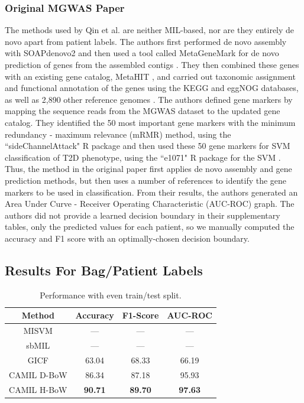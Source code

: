 \subsubsection{Original MGWAS Paper}

The methods used by Qin et al. \cite{qin041012} are neither MIL-based, nor are they entirely de novo apart from patient labels. The authors first performed de novo assembly with SOAPdenovo2 \cite{luo12} and then used a tool called MetaGeneMark \cite{zhu10, besemer99} for de novo prediction of genes from the assembled contigs \cite{qin041012}. They then combined these genes with an existing gene catalog, MetaHIT \cite{qin030410}, and carried out taxonomic assignment and functional annotation of the genes using the KEGG \cite{kanehisa00} and eggNOG \cite{powell12} databases, as well as 2,890 other reference genomes \cite{qin041012}. The authors defined gene markers by mapping the sequence reads from the MGWAS dataset to the updated gene catalog. They identified the 50 most important gene markers with the minimum redundancy - maximum relevance (mRMR) \cite{peng05} method, using the ``sideChannelAttack" R package and then used these 50 gene markers for SVM classification of T2D phenotype, using the ``e1071" R package for the SVM \cite{qin041012}. Thus, the method in the original paper first applies de novo assembly and gene prediction methods, but then uses a number of references to identify the gene markers to be used in classification. From their results, the authors generated an Area Under Curve - Receiver Operating Characteristic (AUC-ROC) graph. The authors did not provide a learned decision boundary in their supplementary tables, only the predicted values for each patient, so we manually computed the accuracy and F1 score with an optimally-chosen decision boundary. 



\subsection{Results For Bag/Patient Labels}

\begin{table}[h]
\begin{center} 
\caption{Performance with even train/test split.} 
\label{tab:even-comp}
\begin{tabular}{|c|ccc|}\hline
Method & Accuracy & F1-Score & AUC-ROC\\\hline
MISVM & --- & --- & ---\\\hline
sbMIL & --- & --- & ---\\\hline
GICF & 63.04 & 68.33 & 66.19\\\hline %
CAMIL D-BoW & 86.34 & 87.18 & 95.93\\\hline
CAMIL H-BoW & \bf{90.71} & \bf{89.70} & \bf{97.63}\\\hline
\end{tabular}
\end{center}
\end{table}

